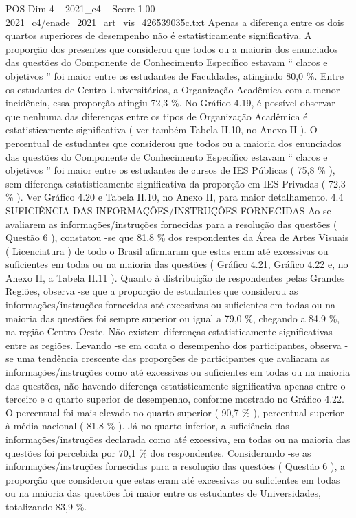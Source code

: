 \begin{textsample}{POS Dim 4 – 2021\_c4 – Score 1.00 – 2021\_c4/enade\_2021\_art\_vis\_426539035c.txt}
Apenas a diferença entre os dois quartos superiores de desempenho não é estatisticamente significativa.
A proporção dos presentes que considerou que todos ou a maioria dos enunciados das questões do Componente de Conhecimento Específico estavam “ claros e objetivos ” foi maior entre os estudantes de Faculdades, atingindo 80,0 \%.
Entre os estudantes de Centro Universitários, a Organização Acadêmica com a menor incidência, essa proporção atingiu 72,3 \%.
No Gráfico 4.19, é possível observar que nenhuma das diferenças entre os tipos de Organização Acadêmica é estatisticamente significativa ( ver também Tabela II.10, no Anexo II ).
O percentual de estudantes que considerou que todos ou a maioria dos enunciados das questões do Componente de Conhecimento Específico estavam “ claros e objetivos ” foi maior entre os estudantes de cursos de IES Públicas ( 75,8 \% ), sem diferença estatisticamente significativa da proporção em IES Privadas ( 72,3 \% ).
Ver Gráfico 4.20 e Tabela II.10, no Anexo II, para maior detalhamento. 4.4 SUFICIÊNCIA DAS INFORMAÇÕES/INSTRUÇÕES FORNECIDAS Ao se avaliarem as informações/instruções fornecidas para a resolução das questões ( Questão 6 ), constatou -se que 81,8 \% dos respondentes da Área de Artes Visuais ( Licenciatura ) de todo o Brasil afirmaram que estas eram até excessivas ou suficientes em todas ou na maioria das questões ( Gráfico 4.21, Gráfico 4.22 e, no Anexo II, a Tabela II.11 ).
Quanto à distribuição de respondentes pelas Grandes Regiões, observa -se que a proporção de estudantes que considerou as informações/instruções fornecidas até excessivas ou suficientes em todas ou na maioria das questões foi sempre superior ou igual a 79,0 \%, chegando a 84,9 \%, na região Centro-Oeste.
Não existem diferenças estatisticamente significativas entre as regiões.
Levando -se em conta o desempenho dos participantes, observa -se uma tendência crescente das proporções de participantes que avaliaram as informações/instruções como até excessivas ou suficientes em todas ou na maioria das questões, não havendo diferença estatisticamente significativa apenas entre o terceiro e o quarto superior de desempenho, conforme mostrado no Gráfico 4.22.
O percentual foi mais elevado no quarto superior ( 90,7 \% ), percentual superior à média nacional ( 81,8 \% ).
Já no quarto inferior, a suficiência das informações/instruções declarada como até excessiva, em todas ou na maioria das questões foi percebida por 70,1 \% dos respondentes.
Considerando -se as informações/instruções fornecidas para a resolução das questões ( Questão 6 ), a proporção que considerou que estas eram até excessivas ou suficientes em todas ou na maioria das questões foi maior entre os estudantes de Universidades, totalizando 83,9 \%.

\end{textsample}
